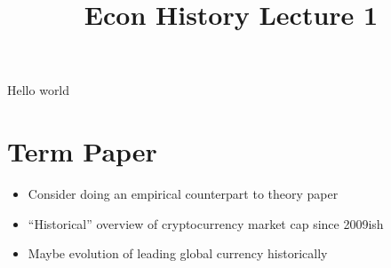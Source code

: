 \documentclass[dvipsnames]{article}
\title{Econ History Lecture 1}
\begin{document}
\maketitle
Hello world
\section{Term Paper}
\begin{itemize}
\item Consider doing an empirical counterpart to theory paper
  \item ``Historical'' overview of cryptocurrency market cap since 2009ish
    \item Maybe evolution of leading global currency historically
\end{itemize}
\end{document}
